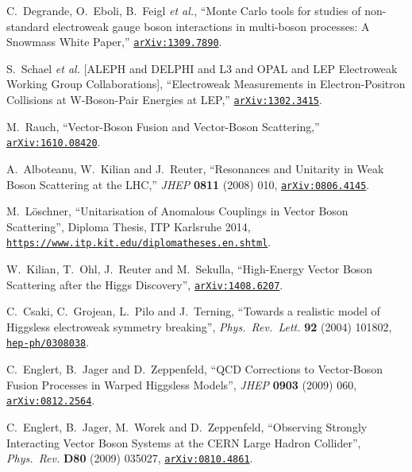 \documentclass[english,12pt]{article}
\begin{document}
\begin{thebibliography}{10}
  C.~Degrande, O.~Eboli, B.~Feigl {\it et al.},
  ``Monte Carlo tools for studies of non-standard electroweak gauge boson interactions in multi-boson processes: A Snowmass White Paper,''
  \href{https://arxiv.org/abs/1309.7890}{{\tt arXiv:1309.7890}}.

  S.~Schael {\it et al.}  [ALEPH and DELPHI and L3 and OPAL and LEP Electroweak Working Group Collaborations],
  ``Electroweak Measurements in Electron-Positron Collisions at W-Boson-Pair Energies at LEP,''
  \href{https://arxiv.org/abs/1302.3415}{{\tt arXiv:1302.3415}}.

  M.~Rauch,
  ``Vector-Boson Fusion and Vector-Boson Scattering,''
  \href{https://arxiv.org/abs/1610.08420}{{\tt arXiv:1610.08420}}.

  A.~Alboteanu, W.~Kilian and J.~Reuter,
  ``Resonances and Unitarity in Weak Boson Scattering at the LHC,''
  {\em JHEP} {\bf 0811} (2008) 010,
  \href{https://arxiv.org/abs/0806.4145}{{\tt arXiv:0806.4145}}.

M.~L\"oschner, ``Unitarisation of Anomalous Couplings 
in Vector Boson Scattering'', {Diploma Thesis, ITP Karlsruhe 2014}, 
\href{https://www.itp.kit.edu/diplomatheses.en.shtml}{{\tt https://www.itp.kit.edu/diplomatheses.en.shtml}}.

W.~Kilian, T.~Ohl, J.~Reuter and M.~Sekulla,
``{High-Energy Vector Boson Scattering after the Higgs Discovery}'',
 \href{https://arxiv.org/abs/1408.6207}{{\tt arXiv:1408.6207}}.

C.~Csaki, C.~Grojean, L.~Pilo and J.~Terning, ``{Towards a realistic model of
  Higgsless electroweak symmetry breaking}'', {\em Phys.\ Rev.\ Lett.} {\bf 92}
  (2004) 101802,
\href{https://www.arXiv.org/abs/hep-ph/0308038}{{\tt hep-ph/0308038}}.

  C.~Englert, B.~Jager and D.~Zeppenfeld,
  ``QCD Corrections to Vector-Boson Fusion Processes in Warped Higgsless Models'',
  {\em JHEP} {\bf 0903 } (2009) 060,
 \href{https://arxiv.org/abs/0812.2564} {{\tt arXiv:0812.2564}}.

  C.~Englert, B.~Jager, M.~Worek and D.~Zeppenfeld,
  ``{Observing Strongly Interacting Vector Boson Systems at the CERN Large
  Hadron Collider}'',
  {\em Phys.\ Rev.} {\bf D80} (2009) 035027,
  \href{https://arxiv.org/abs/0810.4861}{{\tt arXiv:0810.4861}}.
  

\end{thebibliography}
\end{document}

